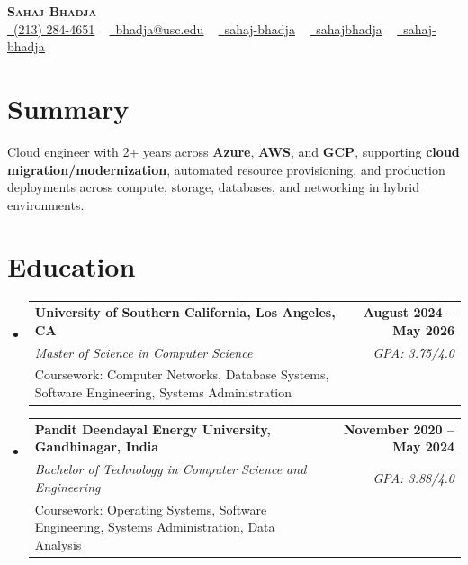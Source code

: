 \documentclass[letterpaper,10pt]{article}
\makeatletter
\newcommand{\resumeEduSubheading}[5]{\vspace{-1pt}\item\begin{tabular*}{1.0\textwidth}[t]{l@{\extracolsep{\fill}}r}\textbf{#1} & \textbf{\small #2} \\\textit{\small #3} & \textit{\small #4} \\\small #5 & \\\end{tabular*}\vspace{-4pt}}
\newcommand{\resumeSubHeadingListStart}{\begin{itemize}[leftmargin=0.0in, label={}]}
\newcommand{\resumeSubHeadingListEnd}{\end{itemize}}
\makeatother
\begin{document}
\begin{center}
{\Huge \scshape \textbf{Sahaj Bhadja}} \\ \vspace{1pt}
\small \href{tel:(213) 284-4651}{\faPhone\ \underline{(213) 284-4651}} ~ \href{mailto:bhadja@usc.edu}{\raisebox{-0.2\height}\faEnvelope\ \underline{bhadja@usc.edu}} ~
\href{https://www.linkedin.com/in/sahaj-bhadja/}{\raisebox{-0.2\height}\faLinkedin\ \underline{sahaj-bhadja}} ~ \href{https://github.com/SAHAJ-BHADJA}{\raisebox{-0.2\height}\faGithub\ \underline{sahajbhadja}} ~
\href{https://sahaj-bhadja.vercel.app/}{\raisebox{-0.2\height}\faGlobe\ \underline{sahaj-bhadja}}
\end{center}
\vspace{-18pt}
\section{Summary}
\begin{itemize}[leftmargin=0.15in, label={}]
\small{\item{Cloud engineer with 2+ years across \textbf{Azure}, \textbf{AWS}, and \textbf{GCP}, supporting \textbf{cloud migration/modernization}, automated resource provisioning, and production deployments across compute, storage, databases, and networking in hybrid environments.}}
\end{itemize}
\vspace{-16pt}
\section{Education}
\resumeSubHeadingListStart
\resumeEduSubheading{University of Southern California, Los Angeles, CA}{August 2024 -- May 2026}{Master of Science in Computer Science}{GPA: 3.75/4.0}{Coursework: Computer Networks, Database Systems, Software Engineering, Systems Administration}
\vspace{-9pt}
\resumeEduSubheading{Pandit Deendayal Energy University, Gandhinagar, India}{November 2020 -- May 2024}{Bachelor of Technology in Computer Science and Engineering}{GPA: 3.88/4.0}{Coursework: Operating Systems, Software Engineering, Systems Administration, Data Analysis}
\resumeSubHeadingListEnd
\vspace{-14pt}
\end{document}
